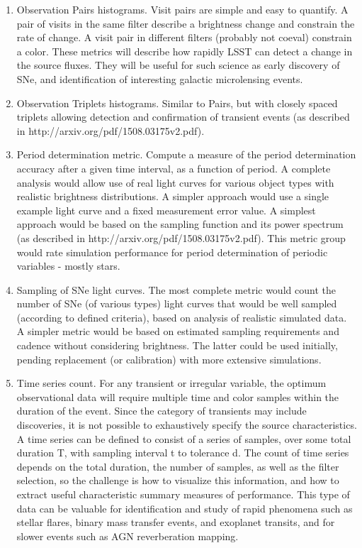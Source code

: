 \begin{enumerate}
\item Observation Pairs histograms.  Visit pairs are simple and easy to quantify.  A pair of visits in the same filter describe a brightness change and constrain the rate of change. A visit pair in different filters (probably not coeval) constrain a color.  These metrics will describe how rapidly LSST can detect a change in the source fluxes. They will be useful for such science as early discovery of SNe, and identification of interesting galactic microlensing events.

\item Observation Triplets histograms. Similar to Pairs, but with closely spaced triplets allowing detection and confirmation of transient events (as described in http://arxiv.org/pdf/1508.03175v2.pdf).

\item Period determination metric.  Compute a measure of the period determination accuracy after a given time interval, as a function of period. A complete analysis would allow use of real light curves for various object types with realistic brightness distributions.  A simpler approach would use a single example light curve and a fixed measurement error value. A simplest approach would be based on the sampling function and its power spectrum (as described in http://arxiv.org/pdf/1508.03175v2.pdf).  This metric group would rate simulation performance for period determination of periodic variables - mostly stars.

\item Sampling of SNe light curves.  The most complete metric would count the number of SNe (of various types) light curves that would be well sampled (according to defined criteria), based on analysis of realistic simulated data.  A simpler metric would be based on estimated sampling requirements and cadence without considering brightness. The latter could be used initially, pending replacement (or calibration) with more extensive simulations.

\item Time series count. For any transient or irregular variable, the optimum observational data will require multiple time and color samples within the duration of the event. Since the category of transients may include discoveries, it is not possible to exhaustively specify the source characteristics. A time series can be defined to consist of a series of samples, over some total duration T, with sampling interval t to tolerance d. The count of time series depends on the total duration, the number of samples, as well as the filter selection, so the challenge is how to visualize this information, and how to extract useful characteristic summary measures of performance.  This type of data can be valuable for identification and study of rapid phenomena such as stellar flares, binary mass transfer events, and exoplanet transits, and for slower events such as AGN reverberation mapping.

\end{enumerate}


